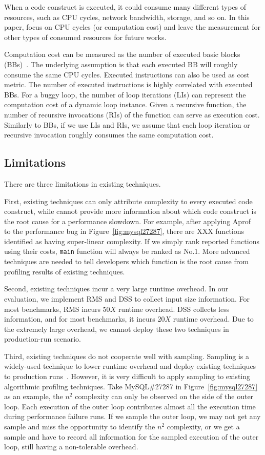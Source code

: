 When a code construct is executed,
it could consume many different types of resources, 
such as CPU cycles, network bandwidth, storage, and so on.
In this paper, focus on CPU cycles (or computation cost) 
and leave the measurement for other types of 
consumed resources for future works. 

Computation cost can be measured 
as the number of executed basic blocks (BBs)~\cite{Aprof1,Aprof2}.
The underlying assumption is that each executed 
BB will roughly consume the same CPU cycles. 
Executed instructions can also be used as cost metric. 
The number of executed instructions is highly correlated with executed BBs.
For a buggy loop, the number of loop iterations (LIs) can represent 
the computation cost of a dynamic loop instance.
Given a recursive function, the number of recursive invocations (RIs) 
of the function can serve as execution cost.
Similarly to BBs, if we use LIs and RIs, 
we assume that each loop iteration or recursive invocation 
roughly consumes the same computation cost. 

\subsection{Limitations}
There are three limitations in existing techniques. 

First, existing techniques can only 
attribute complexity to every executed code construct, 
while cannot provide more information about 
which code construct is the root cause 
for a performance slowdown. 
For example, after applying Aprof~\cite{Aprof1,Aprof2} 
to the performance bug in Figure~\ref{fig:mysql27287}, 
there are {\color{red} XXX} functions identified 
as having super-linear complexity. 
If we simply rank reported functions using their costs, 
\texttt{main} function will always be ranked as No.1. 
More advanced techniques are needed to tell developers 
which function is the root cause from profiling results of existing techniques. 

Second, existing techniques incur a very large runtime overhead. 
In our evaluation, we implement RMS and DSS to collect input size information. 
For most benchmarks, RMS incurs 50$X$ runtime overhead. 
DSS collects less information, and for most benchmarks, it incurs 20$X$ runtime overhead. 
Due to the extremely large overhead, 
we cannot deploy these two techniques in production-run scenario.   

Third, existing techniques do not cooperate well with sampling. 
Sampling is a widely-used technique to lower runtime overhead 
and deploy existing techniques to production runs~\cite{SongOOPSLA2014,liblit03,liblit05,CCI}. 
However, it is very difficult to apply sampling to existing algorithmic profiling techniques. 
Take MySQL\#27287 in Figure~\ref{fig:mysql27287} as an example,
the $n^2$ complexity can only be observed on the side of the outer loop. 
Each execution of the outer loop contributes almost all 
the execution time during performance failure runs. 
If we sample the outer loop, 
we may not get any sample and miss the opportunity to 
identify the $n^2$ complexity, or we get a sample and have to 
record all 
information for the sampled execution of the outer loop, 
still having a non-tolerable overhead. 
